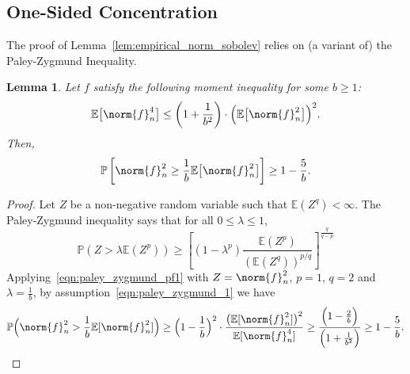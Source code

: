 \documentclass{article}
\newcommand{\1}{\mathbf{1}}
\newcommand{\Ebb}{\mathbb{E}}
\theoremstyle{alden}
\theoremstyle{aldenthm}
\newtheorem{lemma}{Lemma}
\theoremstyle{definition}
\theoremstyle{remark}
\begin{document}
\subsection{One-Sided Concentration}

The proof of Lemma~\ref{lem:empirical_norm_sobolev} relies on (a variant of) the Paley-Zygmund Inequality.
\begin{lemma}
	\label{lem:paley_zygmund}
	Let $f$ satisfy the following moment inequality for some $b \geq 1$:
	\begin{equation}
	\label{eqn:paley_zygmund_1}
	\Ebb\bigl[\norm{f}_n^4\bigr] \leq \left(1 + \frac{1}{b^2}\right)\cdot\Bigl(\Ebb\bigl[\norm{f}_n^2\bigr]\Bigr)^2.
	\end{equation}
	Then,
	\begin{equation}
	\label{eqn:paley_zygmund_2}
	\mathbb{P}\left[\norm{f}_n^2 \geq \frac{1}{b} \Ebb\bigl[\norm{f}_n^2\bigr]\right] \geq 1 - \frac{5}{b}.
	\end{equation}
\end{lemma}
\begin{proof}
	Let $Z$ be a non-negative random variable such that $\mathbb{E}(Z^q) < \infty$. The Paley-Zygmund inequality says that for all $0 \leq \lambda \leq 1$,
	\begin{equation}
	\label{eqn:paley_zygmund_pf1}
	\mathbb{P}(Z > \lambda \mathbb{E}(Z^p)) \geq \left[(1 - \lambda^p) \frac{\mathbb{E}(Z^p)}{(\mathbb{E}(Z^q))^{p/q}}\right]^{\frac{q}{q - p}}
	\end{equation}
	Applying~\eqref{eqn:paley_zygmund_pf1} with $Z = \norm{f}_n^2$, $p = 1$, $q = 2$ and $\lambda = \frac{1}{b}$, by assumption~\eqref{eqn:paley_zygmund_1} we have
	\begin{equation*}
	\mathbb{P}\Bigl(\norm{f}_n^2 > \frac{1}{b} \mathbb{E}[\norm{f}_n^2]\Bigr) \geq \Bigl(1 - \frac{1}{b}\Bigr)^2 \cdot  \frac{\bigl(\mathbb{E}[\norm{f}_n^2]\bigr)^2}{\mathbb{E}[\norm{f}_n^4]} \geq \frac{\Bigl(1 - \frac{2}{b}\Bigr)}{\Bigl(1 + \frac{1}{b^2}\Bigr)} \geq 1 - \frac{5}{b}.
	\end{equation*}
\end{proof}
\end{document}
